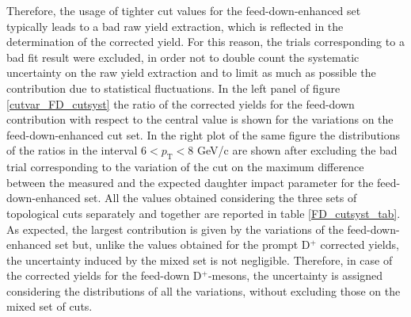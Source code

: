 \documentclass[b5paper,10pt,twoside,oldstyle,classica]{toptesi}
\newcommand{\pt}{p_\text{T}}
\begin{document}
\begin{table}[b]
\begin{center}
\label{FD_cutsyst_tab}
\end{center} 
\end{table} Therefore, the usage of tighter cut values for the feed-down-enhanced set typically leads to a bad raw yield extraction, which is reflected in the determination of the corrected yield. For this reason, the trials corresponding to a bad fit result were excluded, in order not to double count the systematic uncertainty on the raw yield extraction and to limit as much as possible the contribution due to statistical fluctuations. In the left panel of figure \ref{cutvar_FD_cutsyst} the ratio of the corrected yields for the feed-down contribution with respect to the central value is shown for the variations on the feed-down-enhanced cut set. In the right plot of the same figure the distributions of the ratios in the interval $6<\pt<8$ GeV/c are shown after excluding the bad trial corresponding to the variation of the cut on the maximum difference between the measured and the expected daughter impact parameter for the feed-down-enhanced set. All the values obtained considering the three sets of topological cuts separately and together are reported in table \ref{FD_cutsyst_tab}. As expected, the largest contribution is given by the variations of the feed-down-enhanced set but, unlike the values obtained for the prompt D$^+$ corrected yields, the uncertainty induced by the mixed set is not negligible. Therefore, in case of the corrected yields for the feed-down D$^+$-mesons, the uncertainty is assigned considering the distributions of all the variations, without excluding those on the mixed set of cuts.  
\end{document}
